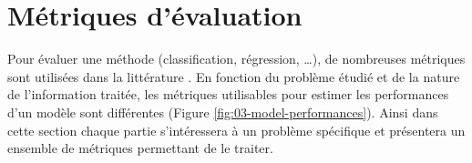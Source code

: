 \documentclass[../thesis.tex]{subfiles}
\begin{document}
    
    
    \newpage
    \section{Métriques d'évaluation}
    
    Pour évaluer une méthode (classification, régression, \dots), de nombreuses métriques sont utilisées dans la littérature \cite{hossin2015review,di2008review}. En fonction du problème étudié et de la nature de l'information traitée, les métriques utilisables pour estimer les performances d'un modèle sont différentes (Figure \ref{fig:03-model-performances}). Ainsi dans cette section chaque partie %
    s'intéressera à un problème spécifique et présentera un ensemble de métriques permettant de le traiter.
    
    
\end{document}
